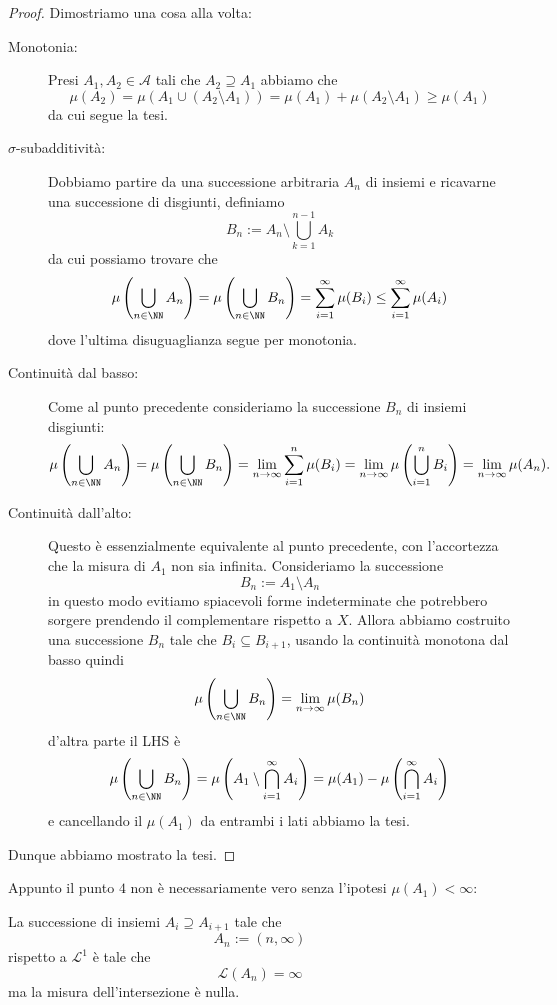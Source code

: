 \documentclass[11pt]{scrartcl}
\begin{document}
	\begin{proof}
		Dimostriamo una cosa alla volta:
		\begin{description}
			\item[Monotonia:] Presi $A_1,A_2\in \mathcal{A}$ tali che $A_2\supseteq A_1$ abbiamo che
			$$\mu(A_2)=\mu\left(A_1\cup \left(A_2\setminus A_1\right)\right)=\mu(A_1)+\mu(A_2\setminus A_1)\ge \mu(A_1)$$
			da cui segue la tesi.
			\item[$\sigma$-subadditività:] Dobbiamo partire da una successione arbitraria $A_n$ di insiemi e ricavarne una successione di disgiunti, definiamo
			$$B_n:=A_n\setminus\bigcup_{k=1}^{n-1}A_k$$
			da cui possiamo trovare che
			$$\mu\left(\bigcup_{n\in\NN}A_n\right)=\mu\left(\bigcup_{n\in\NN}B_n\right)=\sum_{i=1}^{\infty}\mu(B_i)\le \sum_{i=1}^{\infty}\mu(A_i)$$
			dove l'ultima disuguaglianza segue per monotonia.
			\item[Continuità dal basso:] Come al punto precedente consideriamo la successione $B_n$ di insiemi disgiunti:
			$$\mu\left(\bigcup_{n\in\NN}A_n\right)=\mu\left(\bigcup_{n\in\NN}B_n\right)=\lim_{n\to\infty}\sum_{i=1}^{n}\mu(B_i)=\lim_{n\to\infty}\mu\left(\bigcup_{i=1}^nB_i\right)=\lim_{n\to\infty}\mu(A_n).$$
			\item[Continuità dall'alto:] Questo è essenzialmente equivalente al punto precedente, con l'accortezza che la misura di $A_1$ non sia infinita. Consideriamo la successione
			$$B_n:=A_1\setminus A_n$$
			in questo modo evitiamo spiacevoli forme indeterminate che potrebbero sorgere prendendo il complementare rispetto a $X$. Allora abbiamo costruito una successione $B_n$ tale che $B_i\subseteq B_{i+1}$, usando la continuità monotona dal basso quindi
			$$\mu\left(\bigcup_{n\in\NN}B_n\right)=\lim_{n\to\infty}\mu(B_n)$$
			d'altra parte il LHS è
			$$\mu\left(\bigcup_{n\in\NN}B_n\right)=\mu\left(A_1\setminus\bigcap_{i=1}^\infty A_i\right)=\mu(A_1)-\mu\left(\bigcap_{i=1}^\infty A_i\right)$$
			e cancellando il $\mu(A_1)$ da entrambi i lati abbiamo la tesi.
		\end{description}
		Dunque abbiamo mostrato la tesi.
	\end{proof}
	Appunto il punto $4$ non è necessariamente vero senza l'ipotesi $\mu(A_1)<\infty$:
	\begin{example}
		La successione di insiemi $A_i\supseteq A_{i+1}$ tale che
		$$A_n:=\left(n,\infty\right)$$
		rispetto a $\mathscr{L}^1$ è tale che
		$$\mathscr{L}(A_n)=\infty$$
		ma la misura dell'intersezione è nulla.
	\end{example}
\end{document}
